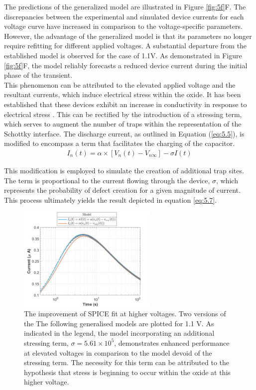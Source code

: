 \noindent The predictions of the generalized model are illustrated in Figure \ref{fig:5f}F. The discrepancies between the experimental and simulated device currents for each voltage curve have increased in comparison to the voltage-specific parameters. However, the advantage of the generalized model is that its parameters no longer require refitting for different applied voltages. A substantial departure from the established model is observed for the case of 1.1V. As demonstrated in Figure \ref{fig:5f}F, the model reliably forecasts a reduced device current during the initial phase of the transient. \\

\noindent This phenomenon can be attributed to the elevated applied voltage and the resultant currents, which induce electrical stress within the oxide. It has been established that these devices exhibit an increase in conductivity in response to electrical stress \cite{mannion2023unipolar}. This can be rectified by the introduction of a stressing term, which serves to augment the number of traps within the representation of the Schottky interface. The discharge current, as outlined in Equation (\ref{eq:5.5}), is modified to encompass a term that facilitates the charging of the capacitor.\\
\begin{align}
    I_n(t) = \alpha \times \left[ V_n(t) - V_{n\infty} \right] -\sigma I(t) \label{eq:5.7} 
\end{align}

\noindent This modification is employed to simulate the creation of additional trap sites. The term is proportional to the current flowing through the device, $\sigma$, which represents the probability of defect creation for a given magnitude of current. This process ultimately yields the result depicted in equation \ref{eq:5.7}.\\

\begin{figure}[htbp!] 
    \centering    
    \includegraphics[width=0.6\textwidth]{Chapter5/Figs/g.png}
    \caption[The improvement of SPICE fit at higher voltages.]{The improvement of SPICE fit at higher voltages. Two versions of the The following generalised models are plotted for 1.1 V. As indicated in the legend, the model incorporating an additional stressing term, $\sigma = 5.61 \times 10^5$, demonstrates enhanced performance at elevated voltages in comparison to the model devoid of the stressing term. The necessity for this term can be attributed to the hypothesis that stress is beginning to occur within the oxide at this higher voltage.}
    \label{fig:5g}
\end{figure}

